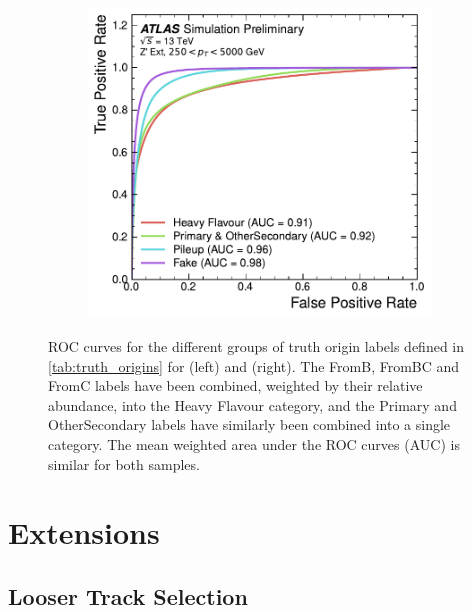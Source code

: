 \begin{figure}[!htbp]
\begin{subfigure}[b]{0.48\textwidth}
        \includegraphics[width=\textwidth]{chapters/gnn_tagger/figs/results/tracks/zprime/zprime_origin_roc_GNNv11.pdf}
    \end{subfigure}
    \caption{ROC curves for the different groups of truth origin labels defined in \cref{tab:truth_origins} for \ttbarjets (left) and \Zprimejets (right).
             The FromB, FromBC and FromC labels have been combined, weighted by their relative abundance, into the Heavy Flavour category, and the Primary and OtherSecondary labels have similarly been combined into a single category.
             The mean weighted area under the ROC curves (AUC) is similar for both samples.}
    \label{fig:track_origin_roc}
\end{figure}




\section{Extensions}
\subsection{Looser Track Selection}\label{sec:looser_track_selection}


